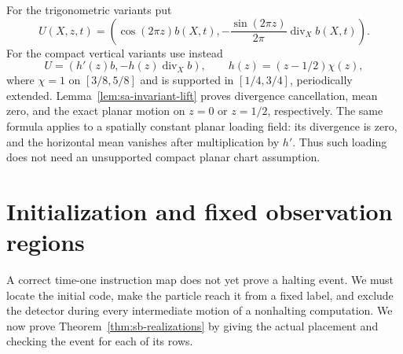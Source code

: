 For the trigonometric variants put
\[
 U(X,z,t)=\left(\cos(2\pi z)b(X,t),
       -\frac{\sin(2\pi z)}{2\pi}\operatorname{div}_X b(X,t)\right).
\]
For the compact vertical variants use instead
\[
 U=(h'(z)b,-h(z)\operatorname{div}_X b),\qquad
 h(z)=(z-1/2)\chi(z),
\]
where $\chi=1$ on $[3/8,5/8]$ and is supported in $[1/4,3/4]$, periodically extended.  Lemma~\ref{lem:sa-invariant-lift} proves divergence cancellation, mean zero, and the exact planar motion on $z=0$ or $z=1/2$, respectively.  The same formula applies to a spatially constant planar loading field: its divergence is zero, and the horizontal mean vanishes after multiplication by $h'$.  Thus such loading does not need an unsupported compact planar chart assumption.

\section{Initialization and fixed observation regions}
\label{sec:sb-events}
A correct time-one instruction map does not yet prove a halting event.
We must locate the initial code, make the particle reach it from a fixed
label, and exclude the detector during every intermediate motion of a
nonhalting computation. We now prove
Theorem~\ref{thm:sb-realizations} by giving the actual placement and
checking the event for each of its rows.

